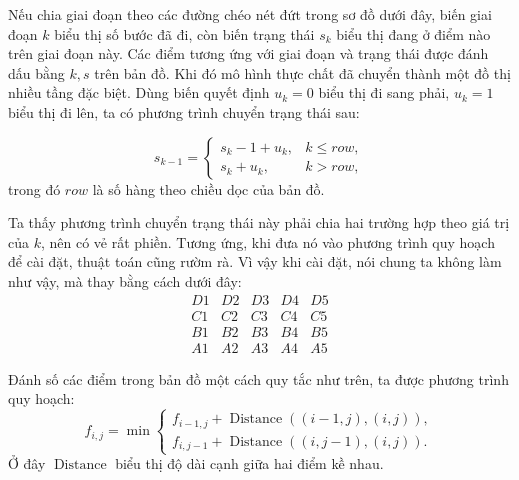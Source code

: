 \documentclass[11pt]{article}
\begin{document}
Nếu chia giai đoạn theo các đường chéo nét đứt trong sơ đồ dưới đây, biến giai
đoạn \(k\) biểu thị số bước đã đi, còn biến trạng thái \(s_k\) biểu thị đang
ở điểm nào trên giai đoạn này. Các điểm tương ứng với giai đoạn và trạng thái
được đánh dấu bằng \(k,s\) trên bản đồ. Khi đó mô hình thực chất đã chuyển
thành một đồ thị nhiều tầng đặc biệt. Dùng biến quyết định \(u_k=0\) biểu thị
đi sang phải, \(u_k=1\) biểu thị đi lên, ta có phương trình chuyển trạng thái
sau:

\begin{center}
\end{center}
\[
  s_{k-1}=
  \begin{cases}
    s_k-1+u_k, & k\le \mathit{row},\\
    s_k+u_k, & k>\mathit{row},
  \end{cases}
\]
trong đó \(\mathit{row}\) là số hàng theo chiều dọc của bản đồ.

Ta thấy phương trình chuyển trạng thái này phải chia hai trường hợp theo giá
trị của \(k\), nên có vẻ rất phiền. Tương ứng, khi đưa nó vào phương trình
quy hoạch để cài đặt, thuật toán cũng rườm rà. Vì vậy khi cài đặt, nói chung
ta không làm như vậy, mà thay bằng cách dưới đây:
\[
\begin{array}{ccccc}
D1&D2&D3&D4&D5\\
C1&C2&C3&C4&C5\\
B1&B2&B3&B4&B5\\
A1&A2&A3&A4&A5
\end{array}
\]

Đánh số các điểm trong bản đồ một cách quy tắc như trên, ta được phương trình
quy hoạch:
\[
  f_{i,j}=\min
  \begin{cases}
    f_{i-1,j}+\operatorname{Distance}((i-1,j),(i,j)),\\
    f_{i,j-1}+\operatorname{Distance}((i,j-1),(i,j)).
  \end{cases}
\]
Ở đây \(\operatorname{Distance}\) biểu thị độ dài cạnh giữa hai điểm kề nhau.
\end{document}

